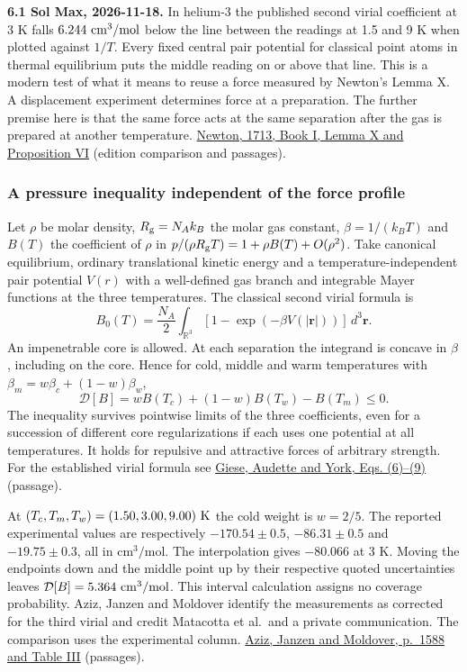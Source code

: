 \documentclass[11pt,a4paper]{article}
\begin{document}
\textbf{6.1 Sol Max, 2026-11-18.} In helium-3 the published second
virial coefficient at 3 K falls \(6.244\ {\rm cm^3/mol}\) below the line
between the readings at 1.5 and 9 K when plotted against \(1/T\). Every
fixed central pair potential for classical point atoms in thermal
equilibrium puts the middle reading on or above that line. This is a
modern test of what it means to reuse a force measured by Newton's Lemma
X. A displacement experiment determines force at a preparation. The
further premise here is that the same force acts at the same separation
after the gas is prepared at another temperature.
\href{newton-insertion-action.md\#lemma-x-and-the-measurement-of-initial-force}{Newton,
1713, Book I, Lemma X and Proposition VI} (edition comparison and
passages).

\subsubsection{A pressure inequality independent of the force
profile}\label{a-pressure-inequality-independent-of-the-force-profile}

Let \(\rho\) be molar density, \(R_{\rm g}=N_Ak_B\) the molar gas
constant, \(\beta=1/(k_BT)\) and \(B(T)\) the coefficient of \(\rho\) in
\(p/(\rho R_{\rm g}T)=1+\rho B(T)+O(\rho^2)\). Take canonical
equilibrium, ordinary translational kinetic energy and a
temperature-independent pair potential \(V(r)\) with a well-defined gas
branch and integrable Mayer functions at the three temperatures. The
classical second virial formula is \[
 B_0(T)=\frac{N_A}{2}\int_{\mathbb R^3}
             [1-\exp(-\beta V(|\mathbf r|))]\,d^3\mathbf r .
\] An impenetrable core is allowed. At each separation the integrand is
concave in \(\beta\), including on the core. Hence for cold, middle and
warm temperatures with \(\beta_m=w\beta_c+(1-w)\beta_w\), \[
 \mathcal D[B]=w B(T_c)+(1-w)B(T_w)-B(T_m)\le0.
\] The inequality survives pointwise limits of the three coefficients,
even for a succession of different core regularizations if each uses one
potential at all temperatures. It holds for repulsive and attractive
forces of arbitrary strength. For the established virial formula see
\href{https://doi.org/10.1063/1.1587684}{Giese, Audette and York, Eqs.
(6)--(9)} (passage).

At \((T_c,T_m,T_w)=(1.50,3.00,9.00)\ {\rm K}\) the cold weight is
\(w=2/5\). The reported experimental values are respectively
\(-170.54\pm0.5\), \(-86.31\pm0.5\) and \(-19.75\pm0.3\), all in
\(\mathrm{cm^3/mol}\). The interpolation gives \(-80.066\) at 3 K.
Moving the endpoints down and the middle point up by their respective
quoted uncertainties leaves \(\mathcal D[B]=5.364\ {\rm cm^3/mol}\).
This interval calculation assigns no coverage probability. Aziz, Janzen
and Moldover identify the measurements as corrected for the third virial
and credit Matacotta et al.~and a private communication. The comparison
uses the experimental column.
\href{https://www.nist.gov/system/files/documents/2017/11/30/085_aziz_ab_initio_prl_1995.pdf}{Aziz,
Janzen and Moldover, p.~1588 and Table III} (passages).
\end{document}
